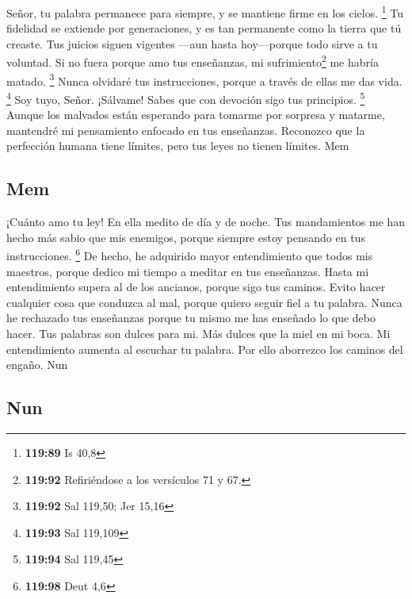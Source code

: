  Señor, tu palabra permanece para siempre, y se mantiene
firme en los cielos. \footnote{\textbf{119:89} Is 40,8} 
Tu fidelidad se extiende por generaciones, y es tan permanente como la
tierra que tú creaste.  Tus juicios siguen vigentes
---aun hasta hoy---porque todo sirve a tu voluntad.  Si
no fuera porque amo tus enseñanzas, mi sufrimiento\footnote{\textbf{119:92}
  Refiriéndose a los versículos 71 y 67.} me habría matado. \footnote{\textbf{119:92}
  Sal 119,50; Jer 15,16}  Nunca olvidaré tus
instrucciones, porque a través de ellas me das vida. \footnote{\textbf{119:93}
  Sal 119,109}  Soy tuyo, Señor. ¡Sálvame! Sabes que con
devoción sigo tus principios. \footnote{\textbf{119:94} Sal 119,45}
 Aunque los malvados están esperando para tomarme por
sorpresa y matarme, mantendré mi pensamiento enfocado en tus enseñanzas.
 Reconozco que la perfección humana tiene límites, pero
tus leyes no tienen límites. Mem

\hypertarget{mem}{%
\subsection{Mem}\label{mem}}

 ¡Cuánto amo tu ley! En ella medito de día y de noche.
 Tus mandamientos me han hecho más sabio que mis
enemigos, porque siempre estoy pensando en tus instrucciones.
\footnote{\textbf{119:98} Deut 4,6}  De hecho, he
adquirido mayor entendimiento que todos mis maestros, porque dedico mi
tiempo a meditar en tus enseñanzas.  Hasta mi
entendimiento supera al de los ancianos, porque sigo tus caminos.
 Evito hacer cualquier cosa que conduzca al mal, porque
quiero seguir fiel a tu palabra.  Nunca he rechazado tus
enseñanzas porque tu mismo me has enseñado lo que debo hacer.
 Tus palabras son dulces para mi. Más dulces que la miel
en mi boca.  Mi entendimiento aumenta al escuchar tu
palabra. Por ello aborrezco los caminos del engaño. Nun

\hypertarget{nun}{%
\subsection{Nun}\label{nun}}

